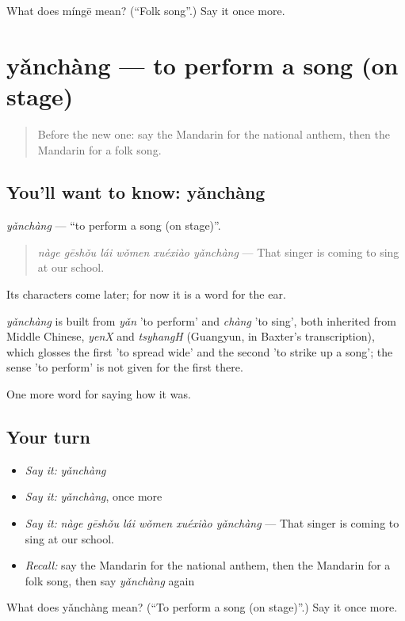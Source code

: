 \begin{tcolorbox}[breakable,colback=teal!4,colframe=teal!35!black,title={Before you move on}]
What does míngē mean? (\textquotedblleft{}Folk song\textquotedblright{}.) Say it once more.
\end{tcolorbox}
\section[yǎnchàng]{yǎnchàng — to perform a song (on stage)}

\label{lesson:ZH-C504-yanchang-sing}



\begin{quote}
Before the new one: say the Mandarin for the national anthem, then the Mandarin for a folk song.
\end{quote}

\subsection*{You'll want to know: yǎnchàng}
\emph{yǎnchàng} — \textquotedblleft{}to perform a song (on stage)\textquotedblright{}.

\begin{quote}
\emph{nàge gēshǒu lái wǒmen xuéxiào yǎnchàng} — That singer is coming to sing at our school.
\end{quote}

Its characters come later; for now it is a word for the ear.

\begin{cousinweb}
\emph{yǎnchàng} is built from \emph{yǎn} 'to perform' and \emph{chàng} 'to sing', both inherited from Middle Chinese, \emph{yenX} and \emph{tsyhangH} (Guangyun, in Baxter's transcription), which glosses the first 'to spread wide' and the second 'to strike up a song'; the sense 'to perform' is not given for the first there.
\end{cousinweb}

\begin{grammarlens}[title={What you've built}]
One more word for saying how it was.
\end{grammarlens}

\subsection*{Your turn}
\begin{itemize}
\raggedright
  \item \emph{Say it:} \emph{yǎnchàng}
  \item \emph{Say it:} \emph{yǎnchàng}, once more
  \item \emph{Say it:} \emph{nàge gēshǒu lái wǒmen xuéxiào yǎnchàng} — That singer is coming to sing at our school.
  \item \emph{Recall:} say the Mandarin for the national anthem, then the Mandarin for a folk song, then say \emph{yǎnchàng} again
\end{itemize}

\begin{tcolorbox}[breakable,colback=teal!4,colframe=teal!35!black,title={Before you move on}]
What does yǎnchàng mean? (\textquotedblleft{}To perform a song (on stage)\textquotedblright{}.) Say it once more.
\end{tcolorbox}
